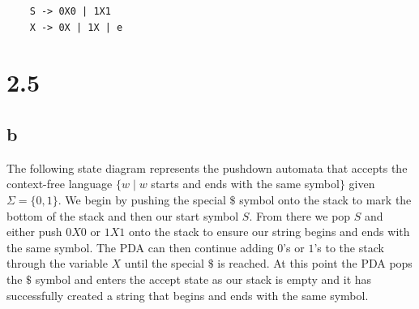 \documentclass{article}
\begin{document}
\begin{center}
    
    \begin{lstlisting}
    S -> 0X0 | 1X1
    X -> 0X | 1X | e
    \end{lstlisting}
    
\end{center}

\section*{2.5}

\subsection*{b}

The following state diagram represents the pushdown automata that accepts the context-free language $\{w \mid w$ starts and ends with the same symbol$\}$ given $\Sigma = \{0, 1\}$. We begin by pushing the special $\$$ symbol onto the stack to mark the bottom of the stack and then our start symbol $S$. From there we pop $S$ and either push $0X0$ or $1X1$ onto the stack to ensure our string begins and ends with the same symbol. The PDA can then continue adding $0$'s or $1$'s to the stack through the variable $X$ until the special $\$$ is reached. At this point the PDA pops the $\$$ symbol and enters the accept state as our stack is empty and it has successfully created a string that begins and ends with the same symbol.
\end{document}
